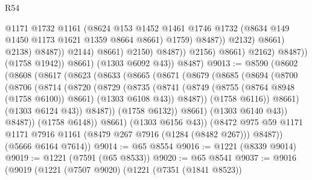 \begin{lexlean}{R54}
\begin{coremodule}
                                              @1171
                                              @1732
                                              @1161
                                              (@8624
                                                @153
                                                @1452
                                                @1461
                                                @1746
                                                @1732
                                                (@8634 @149 @1450 @1173 @1621 @1359 @8664 @8661)
                                                @1759)
                                              @8487))
                                          @2132)
                                        @8661)
                                      @2138)
                                    @8487))
                                @2144)
                              @8661)
                            @2150)
                          @8487))
                      @2156)
                    @8661)
                  @2162)
                @8487))
            (@1758 @1942))
          @8661)
        (@1303 @6092 @43))
      @8487)
@9013 := @8590
    (@8602
      (@8608
        (@8617
          (@8623
            (@8633
              (@8665
                (@8671
                  (@8679
                    (@8685
                      (@8694
                        (@8700
                          (@8706
                            (@8714
                              (@8720
                                (@8729
                                  (@8735
                                    (@8741
                                      (@8749
                                        (@8755 (@8764 @8948 (@1758 @6100)) @8661)
                                        (@1303 @6108 @43))
                                      @8487))
                                  (@1758 @6116))
                                @8661)
                              (@1303 @6124 @43))
                            @8487))
                        (@1758 @6132))
                      @8661)
                    (@1303 @6140 @43))
                  @8487))
              (@1758 @6148))
            @8661)
          (@1303 @6156 @43))
        (@8472 @975 @59 @1171 @1171 @7916 @1161 (@8479 @267 @7916 (@1284 (@8482 @267))) @8487))
      (@5666 @6164 @7614))
@9014 := @65 @8554
@9016 := @1221 (@8339 @9014)
@9019 := @1221 (@7591 (@65 @8533))
@9020 := @65 @8541
@9037 := @9016
    (@9019
      (@1221
        (@7507 @9020)
        (@1221
          (@7351 (@1841 @8523))

\end{coremodule}
\end{lexlean}
